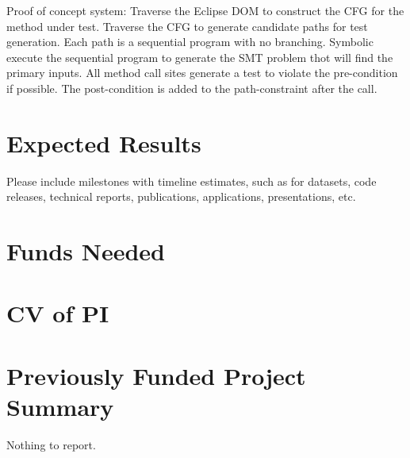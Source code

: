 \documentclass[11pt,onecolumn,notitlepage]{article}
\begin{document}
Proof of concept system: Traverse the Eclipse DOM to construct the CFG for the method under test. Traverse the CFG to generate candidate paths for test generation. Each path is a sequential program with no branching. Symbolic execute the sequential program to generate the SMT problem thot will find the primary inputs. All method call sites generate a test to violate the pre-condition if possible. The post-condition is added to the path-constraint after the call.

\section*{Expected Results}
Please include milestones with timeline estimates, such as for datasets, code releases, technical reports, publications, applications, presentations, etc. 

\section*{Funds Needed}

\appendix
\appendixpage




\section{CV of PI}

\section{Previously Funded Project Summary}
Nothing to report.
\end{document}

